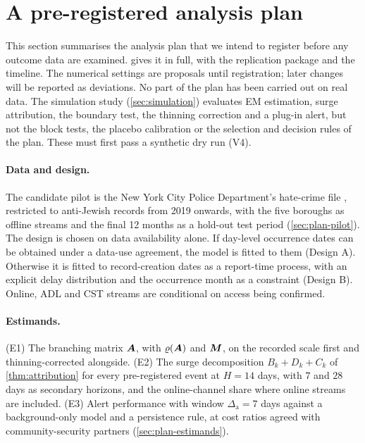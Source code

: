 \section{A pre-registered analysis plan}\label{sec:plan}

This section summarises the analysis plan that we intend to register before any outcome
data are examined.  gives it in full, with the replication package and the
timeline. The numerical settings are proposals until registration; later changes will be
reported as deviations. No part of the plan has been carried out on real data. The
simulation study (\cref{sec:simulation}) evaluates EM estimation, surge attribution, the
boundary test, the thinning correction and a plug-in alert, but not the block tests, the
placebo calibration or the selection and decision rules of the plan. These must first pass
a synthetic dry run (V4).

\paragraph{Data and design.} The candidate pilot is the New York City Police Department's
hate-crime file \citep{nypdhate}, restricted to anti-Jewish records from 2019 onwards, with
the five boroughs as offline streams and the final 12 months as a hold-out test period
(\cref{sec:plan-pilot}). The design is chosen on data availability alone. If day-level
occurrence dates can be obtained under a data-use agreement, the model is fitted to them
(Design A). Otherwise it is fitted to record-creation dates as a report-time process, with
an explicit delay distribution and the occurrence month as a constraint (Design B). Online,
ADL and CST streams are conditional on access being confirmed.

\paragraph{Estimands.} (E1) The branching matrix $\bm{A}$, with $\varrho(\bm{A})$ and $\bm{M}$,
on the recorded scale first and thinning-corrected alongside. (E2) The surge decomposition
$B_k+D_k+C_k$ of \cref{thm:attribution} for every pre-registered event at $H=14$ days, with
$7$ and $28$ days as secondary horizons, and the online-channel share where online streams
are included. (E3) Alert performance with window $\Delta_{\mathrm a}=7$ days against a
background-only model and a persistence rule, at cost ratios agreed with
community-security partners (\cref{sec:plan-estimands}).

